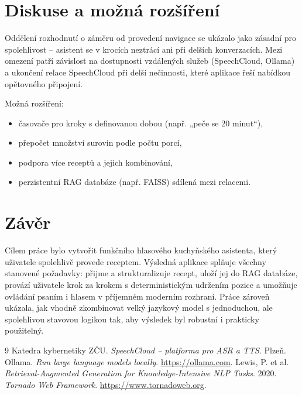 \documentclass[11pt,a4paper]{article}
\begin{document}
\section{Diskuse a možná rozšíření}
Oddělení rozhodnutí o záměru od provedení navigace se ukázalo jako zásadní pro
spolehlivost -- asistent se v krocích neztrácí ani při delších konverzacích. Mezi
omezení patří závislost na dostupnosti vzdálených služeb (SpeechCloud, Ollama) a
ukončení relace SpeechCloud při delší nečinnosti, které aplikace řeší nabídkou
opětovného připojení.

Možná rozšíření:
\begin{itemize}[noitemsep]
  \item časovače pro kroky s definovanou dobou (např. „peče se 20 minut``),
  \item přepočet množství surovin podle počtu porcí,
  \item podpora více receptů a jejich kombinování,
  \item perzistentní RAG databáze (např. FAISS) sdílená mezi relacemi.
\end{itemize}

\section{Závěr}
Cílem práce bylo vytvořit funkčního hlasového kuchyňského asistenta, který uživatele
spolehlivě provede receptem. Výsledná aplikace splňuje všechny stanovené požadavky:
přijme a strukturalizuje recept, uloží jej do RAG databáze, provází uživatele krok za
krokem s deterministickým udržením pozice a umožňuje ovládání psaním i hlasem v
příjemném moderním rozhraní. Práce zároveň ukázala, jak vhodně zkombinovat velký
jazykový model s jednoduchou, ale spolehlivou stavovou logikou tak, aby výsledek byl
robustní i prakticky použitelný.

\begin{thebibliography}{9}
 Katedra kybernetiky ZČU. \emph{SpeechCloud -- platforma pro ASR a TTS}. Plzeň.
 Ollama. \emph{Run large language models locally}. \url{https://ollama.com}.
 Lewis, P. et al. \emph{Retrieval-Augmented Generation for Knowledge-Intensive NLP Tasks}. 2020.
 \emph{Tornado Web Framework}. \url{https://www.tornadoweb.org}.
\end{thebibliography}
\end{document}
